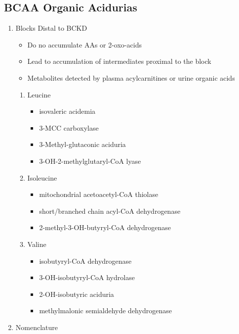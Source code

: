 \documentclass{scrartcl}
\begin{document}
\subsection{BCAA Organic Acidurias}
\label{sec:orge94641e}

\begin{enumerate}
\item Blocks Distal to BCKD
\label{sec:org9efef57}
\begin{itemize}
\item Do no accumulate AAs or 2-oxo-acids
\item Lead to accumulation of intermediates proximal to the block
\item Metabolites detected by plasma acylcarnitines or urine organic acids
\end{itemize}
\begin{enumerate}
\item Leucine
\label{sec:org496fa43}
\begin{itemize}
\item isovaleric acidemia
\item 3-MCC carboxylase
\item 3-Methyl-glutaconic aciduria
\item 3-OH-2-methylglutaryl-CoA lyase
\end{itemize}

\item Isoleucine
\label{sec:org7d18fd3}
\begin{itemize}
\item mitochondrial acetoacetyl-CoA thiolase
\item short/branched chain acyl-CoA dehydrogenase
\item 2-methyl-3-OH-butyryl-CoA dehydrogenase
\end{itemize}

\item Valine
\label{sec:orgc13bffc}
\begin{itemize}
\item isobutyryl-CoA dehydrogenase
\item 3-OH-isobutyryl-CoA hydrolase
\item 2-OH-isobutyric aciduria
\item methylmalonic semialdehyde dehydrogenase
\end{itemize}
\end{enumerate}


\item Nomenclature
\label{sec:orgf1da67d}


\end{enumerate}
\end{document}
